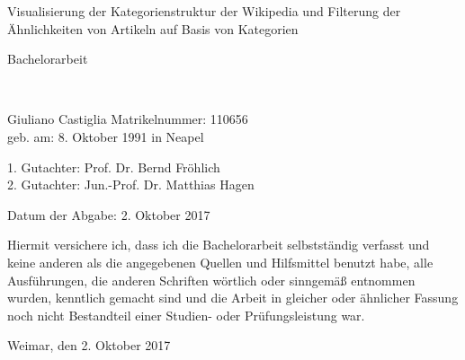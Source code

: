 \begin{center}
\vspace{20mm}
\begin{LARGE}
Visualisierung der Kategorienstruktur der Wikipedia und Filterung der Ähnlichkeiten von Artikeln auf Basis von Kategorien\\
\end{LARGE}
\vspace{20mm}
\begin{LARGE}
Bachelorarbeit
\end{LARGE}\\
\vspace{0.4cm}
\vspace{2 cm}

\vspace{1 cm}
\begin{flushleft}Giuliano Castiglia \hfill Matrikelnummer: 110656\\
geb. am: 8. Oktober 1991 in Neapel
\end{flushleft}

\vspace{0.5 cm}

\begin{flushleft}
1. Gutachter: Prof. Dr. Bernd Fröhlich\\
2. Gutachter: Jun.-Prof. Dr. Matthias Hagen\\
\end{flushleft}

\vspace{1.5cm}
\begin{flushleft}
Datum der Abgabe: 2. Oktober 2017
\end{flushleft}
\end{center}
\clearpage
\pagestyle{useheadings} %
\renewcommand*\contentsname{Inhaltsverzeichnis}



Hiermit versichere ich, dass ich die Bachelorarbeit selbstständig verfasst und keine anderen als die angegebenen Quellen und Hilfsmittel benutzt habe, alle Ausführungen, die anderen Schriften wörtlich oder sinngemäß entnommen wurden, kenntlich gemacht sind und die Arbeit in gleicher oder ähnlicher Fassung noch nicht Bestandteil einer Studien- oder Prüfungsleistung war.

\vspace{3cm}
Weimar, den 2. Oktober 2017

